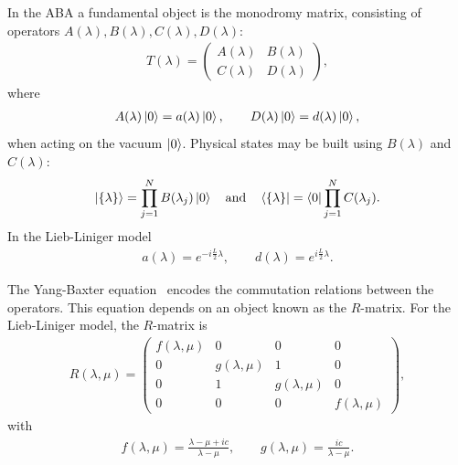 \documentclass[11pt, a4paper]{report} %
\begin{document}
In the ABA a fundamental object is the monodromy matrix, consisting of operators \(A(\lambda), B(\lambda), C(\lambda), D(\lambda)\):
\begin{align}
  \label{eq:31}
  T(\lambda) =
  \begin{pmatrix}
    A(\lambda) & B(\lambda) \\
    C(\lambda) & D(\lambda)
  \end{pmatrix},
\end{align}
where 
\begin{align}
  \label{eq:36}
  A(\lambda) \ket{0} = a(\lambda)\ket{0},\qquad D(\lambda) \ket{0} = d(\lambda)\ket{0},
\end{align}
when acting on the vacuum \(\ket{0}\).
Physical states may be built using \(B(\lambda)\) and \(C(\lambda)\):
\begin{align}
  \label{eq:42}
  \ket{\{\lambda\}} = \prod_{j=1}^{N} B\qty(\lambda_j) \ket{0} \quad \mathrm{and} \quad \bra{\{\lambda\}} = \bra{0} \prod_{j=1}^N C\qty(\lambda_j).
\end{align}
In the Lieb-Liniger model~\cite{Piroli2015}
\begin{align}
  \label{eq:43}
  a(\lambda) = e^{-i\frac{L}{2}\lambda}, \qquad d(\lambda) = e^{i\frac{L}{2}\lambda}.
\end{align}

The Yang-Baxter equation~\cite{Korepin1993} encodes the commutation relations between the operators.
This equation depends on an object known as the \(R\)-matrix.
For the Lieb-Liniger model, the \(R\)-matrix is
\begin{align}
  \label{eq:45}
  R(\lambda,\mu) = 
  \begin{pmatrix}
    f(\lambda, \mu) & 0 & 0 & 0\\
    0 & g(\lambda, \mu) & 1 & 0\\
    0 & 1 & g(\lambda, \mu) & 0 \\
    0 & 0 & 0 & f(\lambda,\mu)
  \end{pmatrix},
\end{align}
with
\begin{align}
  \label{eq:46}
  f(\lambda,\mu) = \frac{\lambda-\mu+ic}{\lambda-\mu}, \qquad g(\lambda,\mu) = \frac{ic}{\lambda-\mu}.
\end{align}
\end{document}
